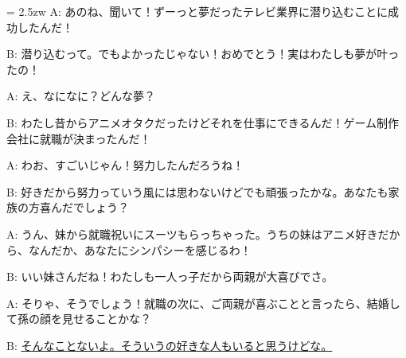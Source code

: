 \documentclass[11pt]{amsart}
\title{}
\author{}
\newenvironment{hangall}[1]{\hangindent = 2.5zw\everypar{\hangindent = 2.5zw}}{}
\begin{document}
\maketitle
\begin{hangall}{}%
A: あのね、聞いて！ずーっと夢だったテレビ業界に潜り込むことに成功したんだ！

B: 潜り込むって。でもよかったじゃない！おめでとう！実はわたしも夢が叶ったの！

A: え、なになに？どんな夢？

B: わたし昔からアニメオタクだったけどそれを仕事にできるんだ！ゲーム制作会社に就職が決まったんだ！

A: わお、すごいじゃん！努力したんだろうね！

B: 好きだから努力っていう風には思わないけどでも頑張ったかな。あなたも家族の方喜んだでしょう？

A: うん、妹から就職祝いにスーツもらっちゃった。うちの妹はアニメ好きだから、なんだか、あなたにシンパシーを感じるわ！

B: いい妹さんだね！わたしも一人っ子だから両親が大喜びでさ。

A: そりゃ、そうでしょう！就職の次に、ご両親が喜ぶことと言ったら、結婚して孫の顔を見せることかな？

B: \ul{そんなことないよ。そういうの好きな人もいると思うけどな。}\end{hangall}
\end{document}
